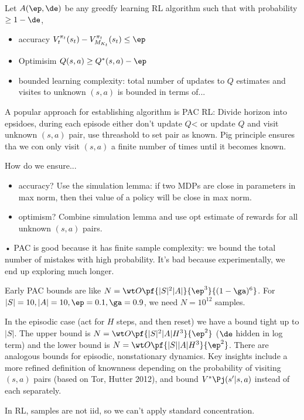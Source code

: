 Let $A(\ep,\de)$ be any greedfy learning RL algorithm such that with probability $\ge 1-\de$,
\begin{itemize}
\item
accuracy $V_t^{\pi_t} (s_t) - V_{M_{K_t}}^{\pi_t}(s_t)\le \ep$
\item
Optimisim $Q(s,a)\ge Q^*(s,a)-\ep$
\item
bounded learning complexity: total number of updates to $Q$ estimates and visites to unknown $(s,a)$ is bounded in terms of...
\end{itemize}

A popular approach for establishing algorithm is PAC RL: Divide horizon into epsidoes, during each episode either don't update $Q$< or update $Q$ and visit unknown $(s,a)$ pair, use threashold to set pair as known. Pig principle ensures tha we con only visit $(s,a)$ a finite number of times until it becomes known.

How do we ensure...
\begin{itemize}
\item
accuracy? Use the simulation lemma: if two MDPs are close in parameters in max norm, then thei value of a policy will be close in max norm.
\item
optimism? Combine simulation lemma and use opt estimate of rewards for all unknown $(s,a)$ pairs.
\end{itemize}•
PAC is good because it has finite sample complexity: we bound the total number of mistakes with high probability.
It's bad because experimentally, we end up exploring much longer.

Early PAC bounds are like $N=\wt O\pf{|S|^2|A|}{\ep^3}{(1-\ga)^6}$. For $|S|=10, |A|=10, \ep=0.1, \ga=0.9$, we need $N=10^{12}$ samples.

In  the episodic case (act for $H$ steps, and then reset) we have a bound tight up to $|S|$. The upper bound is $N=\wt O\pf{|S|^2|A|H^3}{\ep^2}$ ($\de$ hidden in log term) %
and the lower bound is $N=\wt O\pf{|S||A|H^3}{\ep^2}$. There are analogous bounds for episodic, nonstationary dynamics. Key insights include a more refined definition of knownness depending on the probability of visiting $(s,a)$ pairs (based on Tor, Hutter 2012), and bound $V^*\Pj(s'|s,a)$ instead of each separately.

In RL, samples are not iid, so we can't apply standard concentration.


